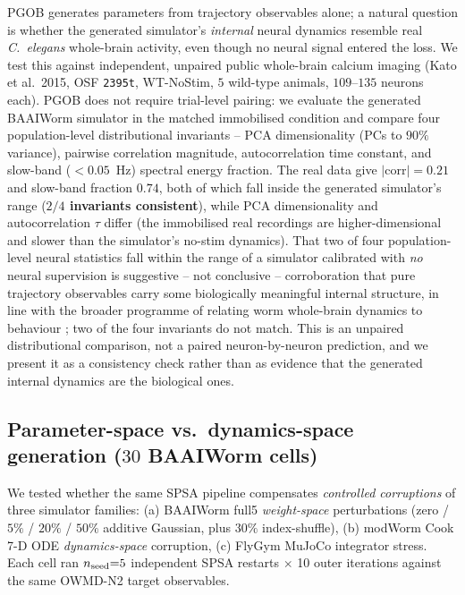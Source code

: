 \documentclass[11pt]{article}
\begin{document}
PGOB generates parameters from trajectory observables alone; a natural question is whether the generated simulator's \emph{internal} neural dynamics resemble real \emph{C.\ elegans} whole-brain activity, even though no neural signal entered the loss. We test this against independent, unpaired public whole-brain calcium imaging \citep{kato2015global,nguyen2016whole} (Kato et al.\ 2015, OSF \texttt{2395t}, WT-NoStim, $5$ wild-type animals, $109$--$135$ neurons each). PGOB does not require trial-level pairing: we evaluate the generated BAAIWorm simulator in the matched immobilised condition and compare four population-level distributional invariants -- PCA dimensionality (PCs to $90\%$ variance), pairwise correlation magnitude, autocorrelation time constant, and slow-band ($<0.05$~Hz) spectral energy fraction. The real data give $|\mathrm{corr}|{=}0.21$ and slow-band fraction $0.74$, both of which fall inside the generated simulator's range (\textbf{$2/4$ invariants consistent}), while PCA dimensionality and autocorrelation $\tau$ differ (the immobilised real recordings are higher-dimensional and slower than the simulator's no-stim dynamics). That two of four population-level neural statistics fall within the range of a simulator calibrated with \emph{no} neural supervision is suggestive -- not conclusive -- corroboration that pure trajectory observables carry some biologically meaningful internal structure, in line with the broader programme of relating worm whole-brain dynamics to behaviour \citep{kato2015global,randi2023multimodal}; two of the four invariants do not match. This is an unpaired distributional comparison, not a paired neuron-by-neuron prediction, and we present it as a consistency check rather than as evidence that the generated internal dynamics are the biological ones.

\subsection{Parameter-space vs.\ dynamics-space generation ($30$ BAAIWorm cells)}
\label{sec:claim4}

We tested whether the same SPSA pipeline compensates \emph{controlled corruptions} of three simulator families: (a) BAAIWorm full5 \emph{weight-space} perturbations (zero / $5\%$ / $20\%$ / $50\%$ additive Gaussian, plus $30\%$ index-shuffle), (b) modWorm Cook 7-D ODE \emph{dynamics-space} corruption, (c) FlyGym MuJoCo integrator stress. Each cell ran $n_{\rm seed}{=}5$ independent SPSA restarts $\times$ 10 outer iterations against the same OWMD-N2 target observables.
\end{document}
